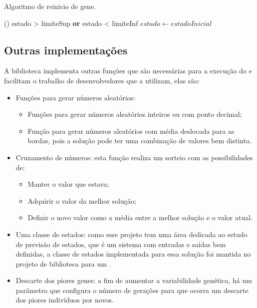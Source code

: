 \begin{algoritmo}
\caption{Algoritmo de reinicio de gene.}
\label{algoritmo:gene_reset}
    \If()
    {estado > limiteSup {\normalfont \textbf{or}} estado < limiteInf} {
        $estado \gets estadoInicial$
    }
\end{algoritmo}

\subsection{Outras implementações} \label{secao:vetor_estados}

A biblioteca implementa outras funções que são necessárias para a execução do \SE e facilitam o trabalho de desenvolvedores que a utilizam, elas são:

\begin{itemize}
    \item Funções para gerar números aleatórios:
        \begin{itemize}
            \item Funções para gerar números aleatórios inteiros ou com ponto decimal;
            \item Função para gerar números aleatórios com média deslocada para as bordas, pois a solução pode ter uma combinação de valores bem distinta.
        \end{itemize}
    \item Cruzamento de números: esta função realiza um sorteio com as possibilidades de:
        \begin{itemize}
            \item Manter o valor que estava;
            \item Adquirir o valor da melhor solução;
            \item Definir o novo valor como a média entre a melhor solução e o valor atual.
        \end{itemize}
    \item Uma classe de estados: como esse projeto tem uma área dedicada ao estudo de previsão de estados, que é um sistema com entradas e saídas bem definidas, a classe de estados implementada para essa solução foi mantida no projeto de biblioteca para um \SE.
    \item Descarte dos piores genes: a fim de aumentar a variabilidade genética, há um parâmetro que configura o número de gerações para que ocorra um descarte dos piores indivíduos por novos.
\end{itemize}

